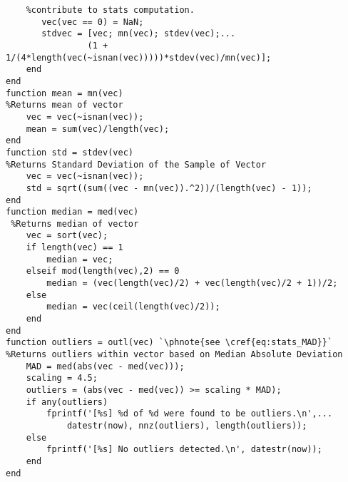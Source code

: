 \begin{lstlisting}
    %contribute to stats computation.
       vec(vec == 0) = NaN;
       stdvec = [vec; mn(vec); stdev(vec);...
                (1 + 1/(4*length(vec(~isnan(vec)))))*stdev(vec)/mn(vec)];
    end
end
function mean = mn(vec)
%Returns mean of vector
    vec = vec(~isnan(vec));
    mean = sum(vec)/length(vec);
end
function std = stdev(vec)
%Returns Standard Deviation of the Sample of Vector
    vec = vec(~isnan(vec));
    std = sqrt((sum((vec - mn(vec)).^2))/(length(vec) - 1));
end
function median = med(vec)
 %Returns median of vector
    vec = sort(vec);
    if length(vec) == 1
        median = vec;
    elseif mod(length(vec),2) == 0
        median = (vec(length(vec)/2) + vec(length(vec)/2 + 1))/2;
    else
        median = vec(ceil(length(vec)/2));
    end
end
function outliers = outl(vec) `\phnote{see \cref{eq:stats_MAD}}`
%Returns outliers within vector based on Median Absolute Deviation
    MAD = med(abs(vec - med(vec)));
    scaling = 4.5;
    outliers = (abs(vec - med(vec)) >= scaling * MAD);
    if any(outliers)
        fprintf('[%s] %d of %d were found to be outliers.\n',...
            datestr(now), nnz(outliers), length(outliers));
    else
        fprintf('[%s] No outliers detected.\n', datestr(now));
    end
end
\end{lstlisting}

